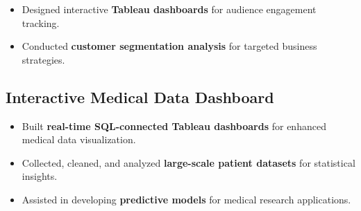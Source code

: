 \documentclass[a4paper,hidelinks]{deedy-resume} %
\begin{document}
\begin{minipage}[t]{0.66\textwidth}
\begin{itemize}
    \item Designed interactive \textbf{Tableau dashboards} for audience engagement tracking.

    \item Conducted \textbf{customer segmentation analysis} for targeted business strategies.

\end{itemize}



\subsection{Interactive Medical Data Dashboard}
\begin{itemize}
    \item Built \textbf{real-time SQL-connected Tableau dashboards} for enhanced medical data visualization.

    \item Collected, cleaned, and analyzed \textbf{large-scale patient datasets} for statistical insights.

    \item Assisted in developing \textbf{predictive models} for medical research applications.

\end{itemize}

\end{minipage}
\end{document}
